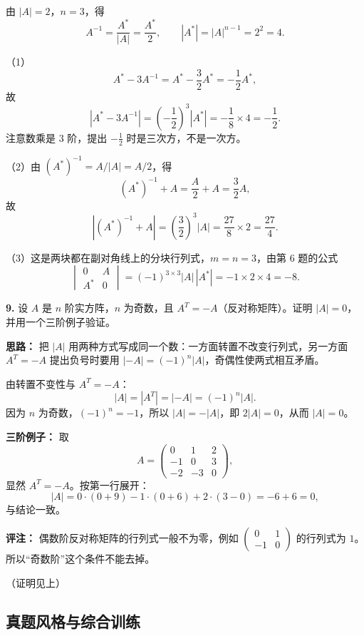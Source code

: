 由 $|A|=2$，$n=3$，得
\[
A^{-1}=\frac{A^{*}}{|A|}=\frac{A^{*}}{2},\qquad |A^{*}|=|A|^{n-1}=2^{2}=4 .
\]

（1）
\[
A^{*}-3A^{-1}=A^{*}-\frac{3}{2}A^{*}=-\frac{1}{2}A^{*},
\]
故
\[
|A^{*}-3A^{-1}|=\left(-\frac{1}{2}\right)^{3}|A^{*}|=-\frac{1}{8}\times4=-\frac{1}{2}.
\]
注意数乘是 $3$ 阶，提出 $-\frac12$ 时是三次方，不是一次方。

（2）由 $(A^{*})^{-1}=A/|A|=A/2$，得
\[
(A^{*})^{-1}+A=\frac{A}{2}+A=\frac{3}{2}A,
\]
故
\[
|(A^{*})^{-1}+A|=\left(\frac{3}{2}\right)^{3}|A|=\frac{27}{8}\times2=\frac{27}{4}.
\]

（3）这是两块都在副对角线上的分块行列式，$m=n=3$，由第 6 题的公式
\[
\begin{vmatrix}0&A\\A^{*}&0\end{vmatrix}=(-1)^{3\times3}|A|\,|A^{*}|=-1\times2\times4=-8 .
\]


\else \answerarea[8] \fi%

\textbf{9.} 设 $A$ 是 $n$ 阶实方阵，$n$ 为奇数，且 $A^{T}=-A$（反对称矩阵）。证明 $|A|=0$，并用一个三阶例子验证。

\ifshowsolutions%
\textbf{思路：} 把 $|A|$ 用两种方式写成同一个数：一方面转置不改变行列式，另一方面 $A^{T}=-A$ 提出负号时要用 $|-A|=(-1)^{n}|A|$，奇偶性使两式相互矛盾。

由转置不变性与 $A^{T}=-A$：
\[
|A|=|A^{T}|=|-A|=(-1)^{n}|A|.
\]
因为 $n$ 为奇数，$(-1)^{n}=-1$，所以 $|A|=-|A|$，即 $2|A|=0$，从而 $|A|=0$。

\textbf{三阶例子：} 取
\[
A=\begin{pmatrix}0&1&2\\-1&0&3\\-2&-3&0\end{pmatrix},
\]
显然 $A^{T}=-A$。按第一行展开：
\[
|A|=0\cdot(0+9)-1\cdot(0+6)+2\cdot(3-0)=-6+6=0,
\]
与结论一致。

\textbf{评注：} 偶数阶反对称矩阵的行列式一般不为零，例如 $\begin{pmatrix}0&1\\-1&0\end{pmatrix}$ 的行列式为 $1$。所以“奇数阶”这个条件不能去掉。

（证明见上）

\else \answerarea[8] \fi%

\subsection{真题风格与综合训练}

